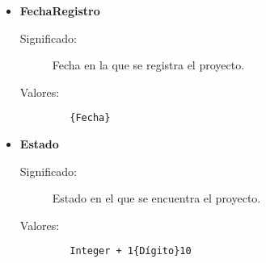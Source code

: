\begin{itemize}
\item \textbf{FechaRegistro}
      \begin{description}
        \item [Significado:] Fecha en la que se registra el proyecto.
        \item [Valores:]{\begin{lstlisting}
   {Fecha}
\end{lstlisting}}\end{description}

\item \textbf{Estado}
      \begin{description}
        \item [Significado:] Estado en el que se encuentra el proyecto.
        \item [Valores:]{\begin{lstlisting}
   Integer + 1{Dígito}10
\end{lstlisting}}\end{description}

\end{itemize}

